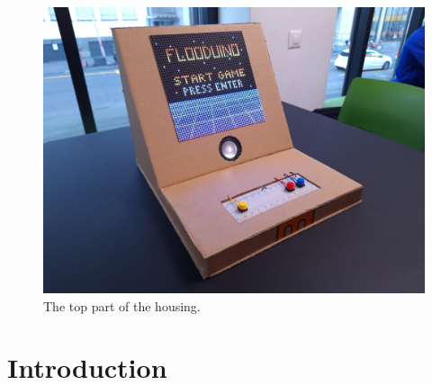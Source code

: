 \documentclass[10pt, a4paper]{article}
\begin{document}
\begin{figure}[h]
\begin{minipage}{0.48\linewidth}
    \includegraphics[width=\linewidth]{top_part.jpg}
    \caption{The top part of the housing.}
    \end{minipage}
\end{figure}


\section*{Introduction}
\end{document}
